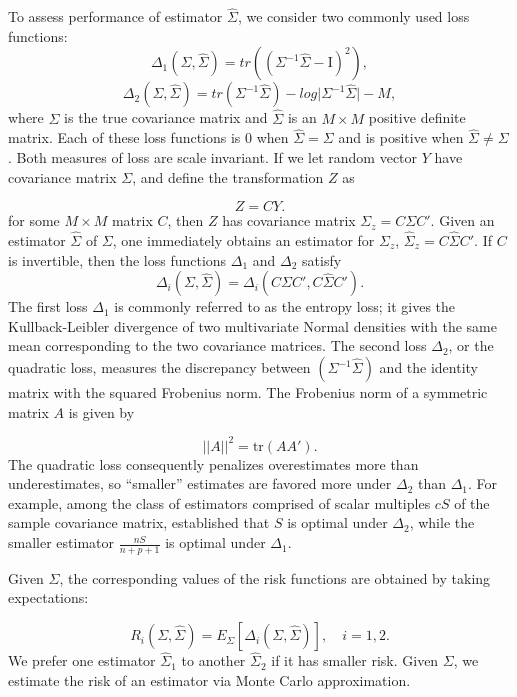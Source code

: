 To assess performance of estimator $\hat{\Sigma}$, we consider two commonly used loss functions:
\begin{equation} \label{eq:quad-loss}
\Delta_1\left(\Sigma,\hat{\Sigma} \right) = tr\left(\left( \Sigma^{-1} \hat{\Sigma} - \mathrm{I}\right)^2 \right),
\end{equation}
\noindent
\begin{equation} \label{eq:entropy-loss}
\Delta_2\left(\Sigma,\hat{\Sigma}\right) = tr\left( \Sigma^{-1} \hat{\Sigma} \right) - log \vert \Sigma^{-1} \hat{\Sigma} \vert - M,
\end{equation}
\noindent
where $\Sigma$ is the true covariance matrix and $\hat{\Sigma}$ is an $M \times M$ positive definite matrix. Each of these loss functions is $0$ when $\hat{\Sigma} = \Sigma$ and is positive when $\hat{\Sigma} \ne \Sigma$. Both measures of loss are scale invariant. If we let random vector $Y$ have covariance matrix $\Sigma$, and define the transformation $Z$ as

\[
Z = CY. 
\]
\noindent
for some $M \times M$ matrix $C$,  then $Z$ has covariance matrix $\Sigma_z = C \Sigma C'$. Given an estimator $\hat{\Sigma}$ of $\Sigma$, one immediately obtains an estimator for $\Sigma_z$, $\hat{\Sigma}_z = C \hat{\Sigma} C'$. If $C$ is invertible, then the loss functions $\Delta_1$ and $\Delta_2$ satisfy
\[
\Delta_i\left(\Sigma,\hat{\Sigma}\right) = \Delta_i\left(C \Sigma C', C \hat{\Sigma}C' \right). 
\]
\noindent
The first loss $\Delta_1$ is commonly referred to as the entropy loss; it gives the Kullback-Leibler divergence of two multivariate Normal densities with the same mean corresponding to the two covariance matrices. The second loss $\Delta_2$, or the quadratic loss, measures the discrepancy between $\left(\Sigma^{-1} \hat{\Sigma}\right)$ and the identity matrix with the squared Frobenius norm. The Frobenius norm of a symmetric matrix $A$ is given by 

\[
\vert \vert A \vert \vert^2 = \mbox{tr}\left(A A'\right).
\]
\noindent
The quadratic loss consequently penalizes overestimates more than underestimates, so ``smaller'' estimates are favored more under $\Delta_2$ than $\Delta_1$. For example, among the class of estimators comprised of scalar multiples $cS$ of the sample covariance matrix, \citet{haff1980empirical} established that $S$ is optimal under $\Delta_2$, while the smaller estimator $\frac{nS}{n+p+1}$ is optimal under $\Delta_1$. 

\bigskip

Given $\Sigma$, the corresponding values of the risk functions are obtained by taking expectations:

\begin{equation*}
R_i \left(\Sigma,\hat{\Sigma}\right) = E_\Sigma\left[\Delta_i\left(\Sigma,\hat{\Sigma}\right)\right], \quad i = 1,2.
\end{equation*}
\noindent
We prefer one estimator $\hat{\Sigma}_1$ to another $\hat{\Sigma}_2$ if it has smaller risk.  Given $\Sigma$, we estimate the risk of an estimator via Monte Carlo approximation. 
